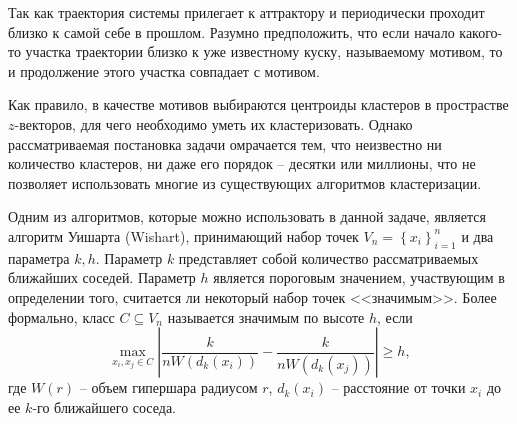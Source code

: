 
Так как траектория системы прилегает к аттрактору и периодически проходит близко к самой себе в прошлом.
Разумно предположить, что если начало какого-то участка траектории близко к уже известному куску, называемому мотивом, то и продолжение этого участка совпадает с мотивом.

Как правило, в качестве мотивов выбираются центроиды кластеров в прострастве $z$-векторов, для чего необходимо уметь их кластеризовать.
Однако рассматриваемая постановка задачи омрачается тем, что неизвестно ни количество кластеров, ни даже его порядок -- десятки или миллионы, что не позволяет использовать многие из существующих алгоритмов кластеризации.

Одним из алгоритмов, которые можно использовать в данной задаче, является алгоритм Уишарта (Wishart), принимающий набор точек $V_n = \left\{ x_i \right\}_{i=1}^{n}$ и два параметра $k, h$.
Параметр $k$ представляет собой количество рассматриваемых ближайших соседей.
Параметр $h$ является пороговым значением, участвующим в определении того, считается ли некоторый набор точек <<значимым>>.
Более формально, класс $C \subseteq V_n$ называется значимым по высоте $h$, если
\begin{equation*}
    \max_{x_i, x_j \in C}
    \left| \frac{k}{n W(d_k(x_i))} - \frac{k}{n W(d_k(x_j))} \right| \geq h,
\end{equation*}
где $W(r)$ -- объем гипершара радиусом $r$, $d_k(x_i)$ -- расстояние от точки $x_i$ до ее $k$-го ближайшего соседа.

